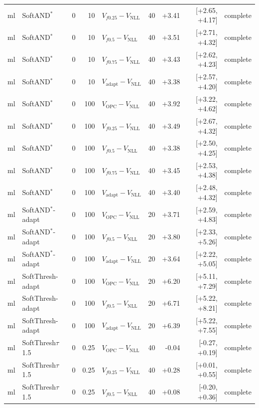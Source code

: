 \documentclass[10pt,a4paper]{article}
\begin{document}
{\begin{longtable}{llrrlrrrl}
ml & SoftAND$^*$ & 0 & 10 & $V_{f0.25}-V_{\mathrm{NLL}}$ & 40 & +3.41 & [+2.65, +4.17] & complete \\
ml & SoftAND$^*$ & 0 & 10 & $V_{f0.5}-V_{\mathrm{NLL}}$ & 40 & +3.51 & [+2.71, +4.32] & complete \\
ml & SoftAND$^*$ & 0 & 10 & $V_{f0.75}-V_{\mathrm{NLL}}$ & 40 & +3.43 & [+2.62, +4.23] & complete \\
ml & SoftAND$^*$ & 0 & 10 & $V_{\mathrm{adapt}}-V_{\mathrm{NLL}}$ & 40 & +3.38 & [+2.57, +4.20] & complete \\
ml & SoftAND$^*$ & 0 & 100 & $V_{\mathrm{OPC}}-V_{\mathrm{NLL}}$ & 40 & +3.92 & [+3.22, +4.62] & complete \\
ml & SoftAND$^*$ & 0 & 100 & $V_{f0.25}-V_{\mathrm{NLL}}$ & 40 & +3.49 & [+2.67, +4.32] & complete \\
ml & SoftAND$^*$ & 0 & 100 & $V_{f0.5}-V_{\mathrm{NLL}}$ & 40 & +3.38 & [+2.50, +4.25] & complete \\
ml & SoftAND$^*$ & 0 & 100 & $V_{f0.75}-V_{\mathrm{NLL}}$ & 40 & +3.45 & [+2.53, +4.38] & complete \\
ml & SoftAND$^*$ & 0 & 100 & $V_{\mathrm{adapt}}-V_{\mathrm{NLL}}$ & 40 & +3.40 & [+2.48, +4.32] & complete \\
ml & SoftAND$^*$-adapt & 0 & 100 & $V_{\mathrm{OPC}}-V_{\mathrm{NLL}}$ & 20 & +3.71 & [+2.59, +4.83] & complete \\
ml & SoftAND$^*$-adapt & 0 & 100 & $V_{f0.5}-V_{\mathrm{NLL}}$ & 20 & +3.80 & [+2.33, +5.26] & complete \\
ml & SoftAND$^*$-adapt & 0 & 100 & $V_{\mathrm{adapt}}-V_{\mathrm{NLL}}$ & 20 & +3.64 & [+2.22, +5.05] & complete \\
ml & SoftThresh-adapt & 0 & 100 & $V_{\mathrm{OPC}}-V_{\mathrm{NLL}}$ & 20 & +6.20 & [+5.11, +7.29] & complete \\
ml & SoftThresh-adapt & 0 & 100 & $V_{f0.5}-V_{\mathrm{NLL}}$ & 20 & +6.71 & [+5.22, +8.21] & complete \\
ml & SoftThresh-adapt & 0 & 100 & $V_{\mathrm{adapt}}-V_{\mathrm{NLL}}$ & 20 & +6.39 & [+5.22, +7.55] & complete \\
ml & SoftThresh$\tau$1.5 & 0 & 0.25 & $V_{\mathrm{OPC}}-V_{\mathrm{NLL}}$ & 40 & -0.04 & [-0.27, +0.19] & complete \\
ml & SoftThresh$\tau$1.5 & 0 & 0.25 & $V_{f0.25}-V_{\mathrm{NLL}}$ & 40 & +0.28 & [+0.01, +0.55] & complete \\
ml & SoftThresh$\tau$1.5 & 0 & 0.25 & $V_{f0.5}-V_{\mathrm{NLL}}$ & 40 & +0.08 & [-0.20, +0.36] & complete \\

\end{longtable}}
\end{document}
